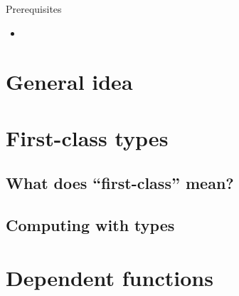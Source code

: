 \documentclass{beamer}
\begin{document}

\begin{frame}{Prerequisites}
\begin{itemize}
	\item 
\end{itemize}
\end{frame}

\section{General idea}

\section{First-class types}

\subsection{What does ``first-class'' mean?}


\subsection{Computing with types}


\section{Dependent functions}

\end{document}

